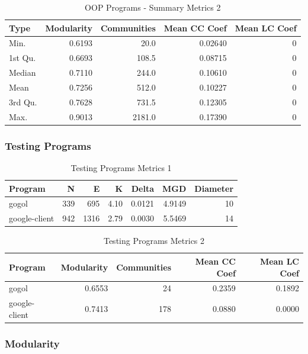 \documentclass[12pt, a4paper]{article}
\begin{document}
\begin{longtable}[H]{l r r r r}
    \caption{OOP Programs - Summary Metrics 2}\label{table:oop_sum_metrics_2}\\
        Type & Modularity & Communities & Mean CC Coef & Mean LC Coef \\
        \hline            
        \endhead
        Min.    & 0.6193 &   20.0 & 0.02640 & 0 \\    
        1st Qu. & 0.6693 &  108.5 & 0.08715 & 0 \\    
        Median  & 0.7110 &  244.0 & 0.10610 & 0 \\    
        Mean    & 0.7256 &  512.0 & 0.10227 & 0 \\    
        3rd Qu. & 0.7628 &  731.5 & 0.12305 & 0 \\    
        Max.    & 0.9013 & 2181.0 & 0.17390 & 0 
\end{longtable}

\subsubsection{Testing Programs}
\begin{longtable}[H]{l r r r r r r}
    \caption{Testing Programs Metrics 1}\label{table:test_metrics_1}\\
        Program &  N & E & K & Delta & MGD & Diameter\\
        \hline            
        \endhead
        gogol         & 339 &  695 & 4.10 & 0.0121 & 4.9149 & 10\\    
        google-client & 942 & 1316 & 2.79 & 0.0030 & 5.5469 & 14\\ 
\end{longtable}

\begin{longtable}[H]{l r r r r}
    \caption{Testing Programs Metrics 2}\label{table:test_metrics_2}\\
        Program & Modularity & Communities & Mean CC Coef & Mean LC Coef \\
        \hline            
        \endhead
        gogol         & 0.6553 &  24 & 0.2359 & 0.1892 \\   
        google-client & 0.7413 & 178 & 0.0880 & 0.0000 \\
\end{longtable}

\subsubsection{Modularity}
\end{document}
